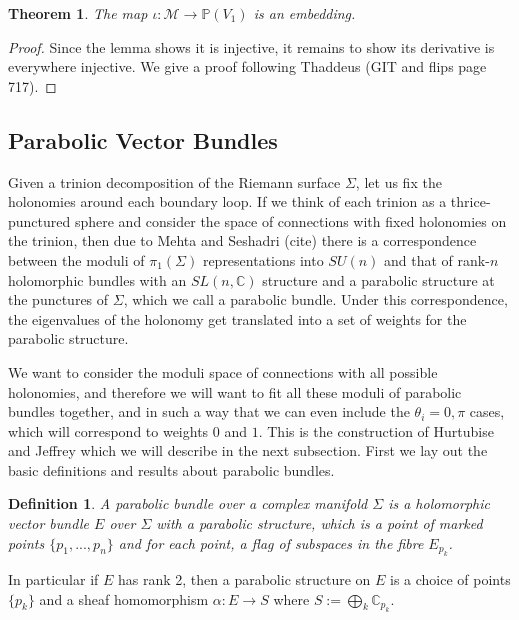 \documentclass[]{article}
\newtheorem{theorem}{Theorem}
\newtheorem{definition}{Definition}
\newcommand{\C}{\mathbb{C}}
\newcommand{\MM}{\mathcal{M}}
\newcommand{\PP}{\mathbb{P}}
\begin{document}
	\begin{theorem}
		The map $\iota:\MM \to \PP(V_1)$ is an embedding.
	\end{theorem}
	\begin{proof}
		Since the lemma shows it is injective, it remains to show its derivative is everywhere injective. We give a proof following Thaddeus (GIT and flips page 717).
	\end{proof}

	\subsection{Parabolic Vector Bundles}
	Given a trinion decomposition of the Riemann surface $\Sigma$, let us fix the holonomies around each boundary loop. If we think of each trinion as a thrice-punctured sphere and consider the space of connections with fixed holonomies on the trinion, then due to Mehta and Seshadri (cite) there is a correspondence between the moduli of $\pi_1(\Sigma)$ representations into $SU(n)$ and that of rank-$n$ holomorphic bundles with an $SL(n,\C)$ structure and a parabolic structure at the punctures of $\Sigma$, which we call a parabolic bundle. Under this correspondence, the eigenvalues of the holonomy get translated into a set of weights for the parabolic structure. 
	
	We want to consider the moduli space of connections with all possible holonomies, and therefore we will want to fit all these moduli of parabolic bundles together, and in such a way that we can even include the $\theta_i = 0,\pi$ cases, which will correspond to weights $0$ and $1$. This is the construction of Hurtubise and Jeffrey which we will describe in the next subsection. First we lay out the basic definitions and results about parabolic bundles.
	\begin{definition}
		A \emph{parabolic bundle} over a complex manifold $\Sigma$ is a holomorphic vector bundle $E$ over $\Sigma$ with a \emph{parabolic structure}, which is a point of marked points $\{p_1,...,p_n\}$ and for each point, a flag of subspaces in the fibre $E_{p_k}$. 
	\end{definition}
	In particular if $E$ has rank 2, then a parabolic structure on $E$ is a choice of points $\{p_k\}$ and a sheaf homomorphism $\alpha:E\to S$ where $S := \bigoplus_{k} \C_{p_k}$.
	
\end{document}
